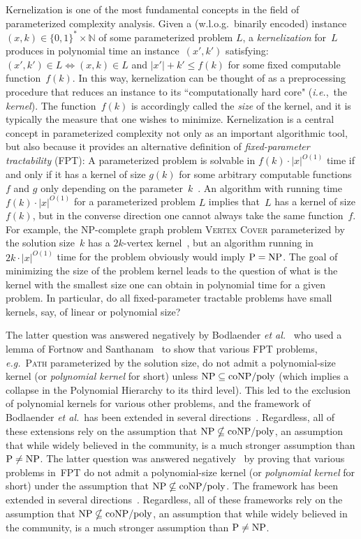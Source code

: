 \documentclass[11pt,a4,USenglish]{article}
\newcommand{\prob}[1]{\textsc{#1}}
\newcommand{\coNP}{\textnormal{coNP}}
\newcommand{\coNPslashpoly}{\textnormal{\coNP{}$/$poly}}
\newcommand{\NP}{\textnormal{NP}}
\newcommand{\PTIME}{\textnormal{P}}
\newcommand{\FPT}{\textnormal{FPT}}
\newcommand{\PnotNP}{$\PTIME{}\neq\NP{}$}
\newcommand{\PeqNP}{$\PTIME{}=\NP{}$}
\newcommand{\NPnotincoNPslashpoly}{$\NP{}\nsubseteq\coNPslashpoly{}$}
\newcommand{\NPincoNPslashpoly}{$\NP{}\subseteq\coNPslashpoly{}$}
\theoremstyle{definition}
\theoremstyle{plain}
\theoremstyle{remark}
\begin{document}
Kernelization is one of the most fundamental concepts in the field of parameterized complexity analysis. 
Given a (w.l.o.g.\ binarily encoded) instance $(x,k) \in \{0,1\}^* \times \mathbb{N}$ of some parameterized problem $L$, a \emph{kernelization} for~$L$ produces in polynomial time an instance~$(x',k')$ satisfying: $(x',k') \in L \iff (x,k) \in L$ and $|x'| + k' \leq f(k)$ for some fixed computable function~$f(k)$. 
In this way, kernelization can be thought of as a preprocessing procedure that reduces an instance to its ``computationally hard core" (\emph{i.e.},~the \emph{kernel}). 
The function~$f(k)$ is accordingly called the \emph{size} of the kernel, and it is typically the measure that one wishes to minimize. Kernelization is a central concept in parameterized complexity not only as an important algorithmic tool, but also because it provides an alternative definition of \emph{fixed-parameter tractability} (\FPT{}): A parameterized problem is solvable in $f(k) \cdot |x|^{O(1)}$ time if and only if it has a kernel of size $g(k)$ for some arbitrary computable functions $f$ and $g$ only depending on the parameter~$k$~\cite{CaiCDF97}.
%
An algorithm with running time $f(k) \cdot |x|^{O(1)}$ for a parameterized problem $L$ implies that~$L$ has a kernel of size $f(k)$, but in the converse direction one cannot always take the same function~$f$. 
\iflong{}%
  For example, the \NP{}-complete graph problem \prob{Vertex Cover} parameterized by the solution size~$k$ has a $2k$-vertex kernel~\cite{ChenKJ01}, but an algorithm running in $2k \cdot |x|^{O(1)}$ time for the problem obviously would imply \PeqNP{}. 
\fi{}%
%
%
The goal of minimizing the size of the problem kernel leads to the question of what is the kernel with the smallest size one can obtain in polynomial time for a given problem. 
In particular, do all fixed-parameter tractable problems have small kernels, say, of linear or polynomial size?

\iflong{}
  The latter question was answered negatively by Bodlaender \emph{et al.}~\cite{BodlaenderDFH09} who used a lemma of Fortnow and Santhanam~\cite{FortnowS11} to show that various \FPT{} problems, \emph{e.g.}~\prob{Path} parameterized by the solution size, do not admit a polynomial-size kernel (or \emph{polynomial kernel} for short) unless \NPincoNPslashpoly{} (which implies a collapse in the Polynomial Hierarchy to its third level). 
  This led to the exclusion of polynomial kernels for various other problems, and the framework of Bodlaender \emph{et al.}~has been extended in several directions~\cite{Kra14}. Regardless, all of these extensions rely on the assumption that \NPnotincoNPslashpoly{}, an assumption that while widely believed in the community, is a much stronger assumption than \PnotNP{}.
\else{}
  The latter question was answered negatively~\cite{BodlaenderDFH09,FortnowS11} by proving that various problems in~\FPT{} do not admit a polynomial-size kernel (or \emph{polynomial kernel} for short) under the assumption that \NPnotincoNPslashpoly{}. 
  The framework has been extended in several directions~\cite{Kra14}. 
  Regardless, all of these frameworks rely on the assumption that \NPnotincoNPslashpoly{}, an assumption that while widely believed in the community, is a much stronger assumption than \PnotNP{}.
\fi{}
\end{document}
